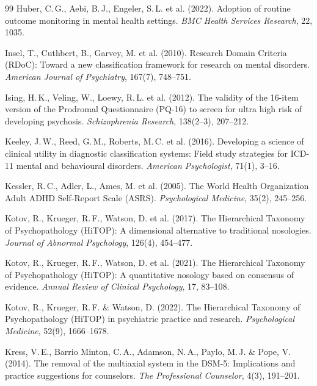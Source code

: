 \documentclass[11pt,a4paper]{article}
\begin{document}
\begin{thebibliography}{99}
Huber, C.\,G., Aebi, B.\,J., Engeler, S.\,L. et al. (2022).
\newblock Adoption of routine outcome monitoring in mental health settings.
\newblock \textit{BMC Health Services Research}, 22, 1035.

Insel, T., Cuthbert, B., Garvey, M. et al. (2010).
\newblock Research Domain Criteria (RDoC): Toward a new classification framework for research on mental disorders.
\newblock \textit{American Journal of Psychiatry}, 167(7), 748--751.

Ising, H.\,K., Veling, W., Loewy, R.\,L. et al. (2012).
\newblock The validity of the 16-item version of the Prodromal Questionnaire (PQ-16) to screen for ultra high risk of developing psychosis.
\newblock \textit{Schizophrenia Research}, 138(2--3), 207--212.

Keeley, J.\,W., Reed, G.\,M., Roberts, M.\,C. et al. (2016).
\newblock Developing a science of clinical utility in diagnostic classification systems: Field study strategies for ICD-11 mental and behavioural disorders.
\newblock \textit{American Psychologist}, 71(1), 3--16.

Kessler, R.\,C., Adler, L., Ames, M. et al. (2005).
\newblock The World Health Organization Adult ADHD Self-Report Scale (ASRS).
\newblock \textit{Psychological Medicine}, 35(2), 245--256.

Kotov, R., Krueger, R.\,F., Watson, D. et al. (2017).
\newblock The Hierarchical Taxonomy of Psychopathology (HiTOP): A dimensional alternative to traditional nosologies.
\newblock \textit{Journal of Abnormal Psychology}, 126(4), 454--477.

Kotov, R., Krueger, R.\,F., Watson, D. et al. (2021).
\newblock The Hierarchical Taxonomy of Psychopathology (HiTOP): A quantitative nosology based on consensus of evidence.
\newblock \textit{Annual Review of Clinical Psychology}, 17, 83--108.

Kotov, R., Krueger, R.\,F. \& Watson, D. (2022).
\newblock The Hierarchical Taxonomy of Psychopathology (HiTOP) in psychiatric practice and research.
\newblock \textit{Psychological Medicine}, 52(9), 1666--1678.

Kress, V.\,E., Barrio Minton, C.\,A., Adamson, N.\,A., Paylo, M.\,J. \& Pope, V. (2014).
\newblock The removal of the multiaxial system in the DSM-5: Implications and practice suggestions for counselors.
\newblock \textit{The Professional Counselor}, 4(3), 191--201.


\end{thebibliography}
\end{document}
